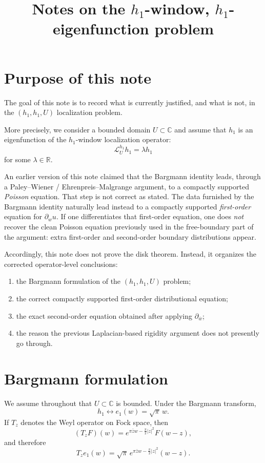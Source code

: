 \documentclass[11pt]{article}
\title{Notes on the \(h_1\)-window, \(h_1\)-eigenfunction problem}
\author{}
\date{}
\newcommand{\C}{\mathbb C}
\newcommand{\R}{\mathbb R}
\newcommand{\1}{\mathbf 1}
\begin{document}
\maketitle

\section{Purpose of this note}

The goal of this note is to record what is currently justified, and what is not, in the
\((h_1,h_1,U)\) localization problem.

More precisely, we consider a bounded domain \(U\subset \C\) and assume that \(h_1\) is an
eigenfunction of the \(h_1\)-window localization operator:
\[
\mathcal L_U^{h_1}h_1=\lambda h_1
\]
for some \(\lambda\in \R\).

An earlier version of this note claimed that the Bargmann identity leads, through a
Paley--Wiener / Ehrenpreis--Malgrange argument, to a compactly supported \emph{Poisson}
equation. That step is not correct as stated. The data furnished by the Bargmann identity
naturally lead instead to a compactly supported \emph{first-order} equation for
\(\partial_w u\). If one differentiates that first-order equation, one does \emph{not}
recover the clean Poisson equation previously used in the free-boundary part of the argument:
extra first-order and second-order boundary distributions appear.

Accordingly, this note does not prove the disk theorem. Instead, it organizes the corrected
operator-level conclusions:
\begin{enumerate}[label=\textnormal{(\arabic*)}]
\item the Bargmann formulation of the \((h_1,h_1,U)\) problem;
\item the correct compactly supported first-order distributional equation;
\item the exact second-order equation obtained after applying \(\partial_{\bar w}\);
\item the reason the previous Laplacian-based rigidity argument does not presently go through.
\end{enumerate}

\section{Bargmann formulation}

We assume throughout that \(U\subset \C\) is bounded. Under the Bargmann transform,
\[
h_1 \longleftrightarrow e_1(w)=\sqrt{\pi}\,w.
\]
If \(T_z\) denotes the Weyl operator on Fock space, then
\[
(T_zF)(w)=e^{\pi \bar z w-\frac{\pi}{2}|z|^2}F(w-z),
\]
and therefore
\[
T_ze_1(w)=\sqrt{\pi}\,e^{\pi \bar z w-\frac{\pi}{2}|z|^2}(w-z).
\]
\end{document}
